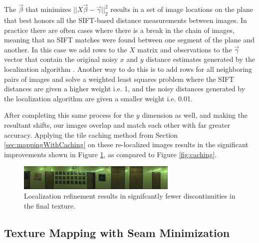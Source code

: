\documentclass[10pt,twocolumn,letterpaper]{article}
\begin{document}
The $\vec{\beta}$ that minimizes $||X \vec{\beta} -
\vec{\gamma}||_2^2$ results in a set of image locations on the plane
that best honors all the SIFT-based distance measurements between
images. In practice there are often cases where there is a break in
the chain of images, meaning that no SIFT matches were found between
one segment of the plane and another. In this case we add rows to the
$X$ matrix and observations to the $\vec{\gamma}$ vector that contain
the original noisy $x$ and $y$ distance estimates generated by the
localization algorithm \cite{chen2010indoor, liu2010indoor}. Another
way to do this is to add rows for all neighboring pairs of images and
solve a weighted least squares problem where the SIFT distances are
given a higher weight i.e. 1, and the noisy distances generated by the
localization algorithm \cite{chen2010indoor, liu2010indoor} are given
a smaller weight i.e. 0.01.

After completing this same process for the $y$ dimension as well, and
making the resultant shifts, our images overlap and match each other
with far greater accuracy. Applying the tile caching method from
Section \ref{sec:mappingWithCaching} on these re-localized images
results in the significant improvements shown in Figure
\ref{fig:shifted}, as compared to Figure \ref{fig:caching}.

\begin{figure}
  \centering
  \includegraphics[width=3in]{wall1_cache_full_shifted.jpg}
  \caption{Localization refinement results in signifcantly fewer
    discontinuities in the final texture.}
  \label{fig:shifted}
\end{figure}



\subsection{Texture Mapping with Seam Minimization}
\label{sec:seamMinimization}
\end{document}
